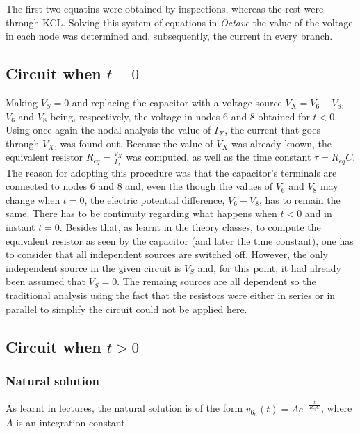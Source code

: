 The first two equatins were obtained by inspections, whereas the rest were through KCL.
Solving this system of equations in \textit{Octave} the value of the voltage in each node was determined and, subsequently, the current in every branch.






\subsection{Circuit when $t=0$} %
Making $V_S=0$ and replacing the capacitor with a voltage source $V_X=V_6-V_8$, $V_6$ and $V_8$ being, respectively, the voltage in nodes 6 and 8 obtained for $t<0$.
Using once again the nodal analysis the value of $I_X$, the current that goes through $V_X$, was found out. Because the value of $V_X$ was already known, the equivalent resistor $R_{eq} = \frac{V_X}{I_X}$ was computed, as well as the time constant $\tau = R_{eq}C$.
The reason for adopting this procedure was that the capacitor's terminals are connected to nodes 6 and 8 and, even the though the values of $V_6$ and $V_8$ may change when $t=0$, the electric potential difference, $V_6-V_8$, has to remain the same. There has to be continuity regarding what happens when $t<0$ and in instant $t=0$. Besides that, as learnt in the theory classes, to compute the equivalent resistor as seen by the capacitor (and later the time constant), one has to consider that all independent sources are switched off. However, the only independent source in the given circuit is $V_S$ and, for this point, it had already been assumed that $V_S=0$. The remaing sources are all dependent so the traditional analysis using the fact that the resistors were either in series or in parallel to simplify the circuit could not be applied here.



\subsection{Circuit when $t>0$}


\subsubsection{Natural solution}  %
As learnt in lectures, the natural solution is of the form $v_{6_{n}}(t) = A e^{-\frac{t}{R_{eq}C}}$, where $A$ is an integration constant.

